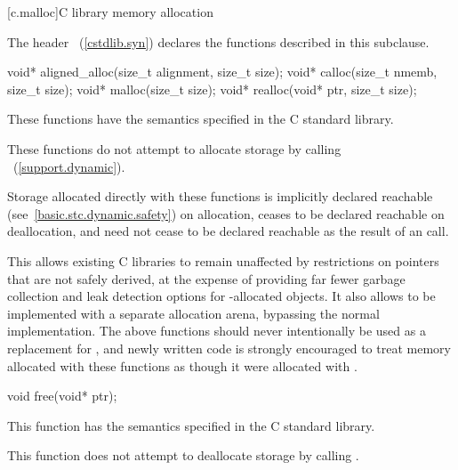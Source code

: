 [c.malloc]{C library memory allocation}

\pnum
{}%
\begin{note}
The header ~(\ref{cstdlib.syn})
declares the functions described in this subclause.
\end{note}

%
%
%
%
\begin{itemdecl}
void* aligned_alloc(size_t alignment, size_t size);
void* calloc(size_t nmemb, size_t size);
void* malloc(size_t size);
void* realloc(void* ptr, size_t size);
\end{itemdecl}

\begin{itemdescr}
\pnum
\effects
These functions have the semantics specified in the C standard library.

\pnum
\remarks
These functions do not attempt to allocate
storage by calling ~(\ref{support.dynamic}).
%

\pnum
Storage allocated directly with these functions
is implicitly declared reachable
(see~\ref{basic.stc.dynamic.safety}) on allocation, ceases to be declared
reachable on deallocation, and need not cease to be declared reachable as the
result of an  call. \begin{note} This allows existing
C libraries to remain unaffected by restrictions on pointers that are not safely
derived, at the expense of providing far fewer garbage collection and leak
detection options for -allocated objects. It also allows
 to be implemented with a separate allocation arena, bypassing
the normal  implementation. The above functions
should never intentionally be used as a replacement for
, and newly written code is strongly encouraged to
treat memory allocated with these functions as though it were allocated with
. \end{note}
\end{itemdescr}

%
\begin{itemdecl}
void free(void* ptr);
\end{itemdecl}

\begin{itemdescr}
\pnum
\effects
This function has the semantics specified in the C standard library.

\pnum
\remarks
This function does not attempt to
deallocate storage by calling
.
\end{itemdescr}

